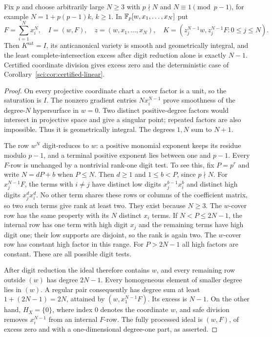 \begin{example}
\label{sci:ex:certified-fermat}
Fix $p$ and choose arbitrarily large $N\ge3$ with $p\nmid N$ and
$N\equiv1\pmod{p-1}$, for example $N=1+p(p-1)k$, $k\ge1$.
In $\mathbb F_p[w,x_1,\ldots,x_N]$ put
\[
 F=\sum_{i=1}^N x_i^N,\quad I=(w,F),\quad
 z=(w,x_1,\ldots,x_N),\quad
 K=(z_j^{N-1}w,z_j^{N-1}F:0\le j\le N).
\]
Then $K^{\mathrm{sat}}=I$, its anticanonical variety is smooth and
geometrically integral, and the least complete-intersection excess
after digit reduction alone is exactly $N-1$. Certified coordinate
division gives excess zero and the deterministic case of
Corollary~\ref{sci:cor:certified-linear}.
\end{example}
\begin{proof}
On every projective coordinate chart a cover factor is a unit, so the
saturation is $I$. The nonzero gradient entries $Nx_i^{N-1}$ prove
smoothness of the degree-$N$ hypersurface in $w=0$. Two distinct
positive-degree factors would intersect in projective space and give
a singular point; repeated factors are also impossible. Thus it is
geometrically integral. The degrees $1,N$ sum to $N+1$.

The row $w^N$ digit-reduces to $w$: a positive monomial exponent keeps
its residue modulo $p-1$, and a terminal positive exponent lies between
one and $p-1$. Every $F$-row is unchanged by a nontrivial rank-one digit
test. To see this, fix $P=p^r$ and write $N=dP+b$ when $P\le N$.
Then $d\ge1$ and $1\le b<P$, since $p\nmid N$.
For $x_j^{N-1}F$, the terms with $i\ne j$ have distinct low digits
$x_j^{b-1}x_i^b$ and distinct high digits $x_j^d x_i^d$.
No other term shares these rows or columns of the coefficient matrix,
so two such terms give rank at least two. They exist because $N\ge3$.
The $w$-cover row has the same property with its $N$ distinct
$x_i$ terms. If $N<P\le2N-1$, the internal row has one term with high
digit $x_j$ and the remaining terms have high digit one; their low
supports are disjoint, so the rank is again two. The $w$-cover row
has constant high factor in this range. For $P>2N-1$ all high factors
are constant. These are all possible digit tests.

After digit reduction the ideal therefore contains $w$, and every
remaining row outside $(w)$ has degree $2N-1$. Every homogeneous
element of smaller degree lies in $(w)$. A regular pair consequently
has degree sum at least $1+(2N-1)=2N$, attained by
$(w,x_1^{N-1}F)$. Its excess is $N-1$. On the other hand,
$H_X=\{0\}$, where index $0$ denotes the coordinate $w$, and safe
division removes $x_i^{N-1}$ from an internal
$F$-row. The fully processed ideal is $(w,F)$, of excess zero and
with a one-dimensional degree-one part, as asserted.
\end{proof}
